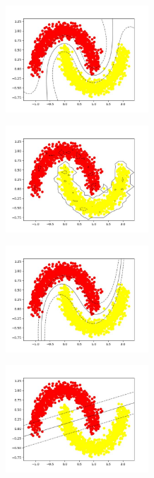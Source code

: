 \documentclass[12pt,titlepage,a4page , tikz , multi,table , svgnames,xcdraw]{article}
\begin{document}
\begin{center}

 \includegraphics[width=0.4\textwidth]{images/20.jpg}

\end{center}


\begin{center}

 \includegraphics[width=0.4\textwidth]{images/21.jpg}

\end{center}


\begin{center}

 \includegraphics[width=0.4\textwidth]{images/22.jpg}

\end{center}

\begin{center}

 \includegraphics[width=0.4\textwidth]{images/23.jpg}

\end{center}
\end{document}
